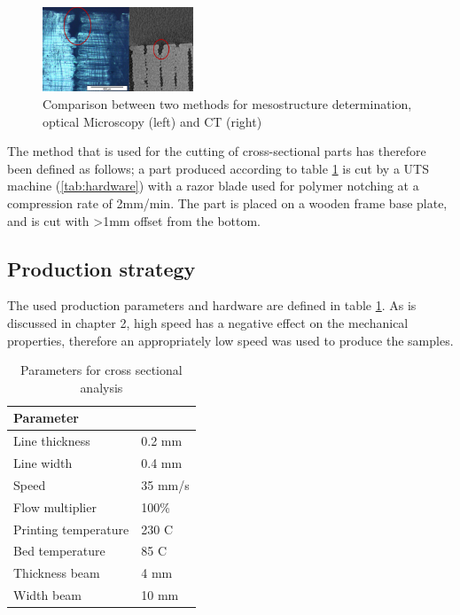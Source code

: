 \begin{figure}[H]
    \centering
    \includegraphics[width=0.4\textwidth]{chapter_4_RVE_Definition/figures/CTOM.jpg}
    \caption{Comparison between two methods for mesostructure determination, optical Microscopy (left) and CT (right) \cite{Veen2019EnhancingTemperature}}
    \label{fig:CTOM}
\end{figure}

The method that is used for the cutting of cross-sectional parts has therefore been defined as follows; a part produced according to table \ref{tab:parameters} is cut by a UTS machine (\ref{tab:hardware}) with a razor blade used for polymer notching at a compression rate of 2mm/min. The part is placed on a wooden frame base plate, and is cut with >1mm offset from the bottom.

\subsection{Production strategy}
The used production parameters and hardware are defined in table \ref{tab:parameters}. As is discussed in chapter 2,  high speed has a negative effect on the mechanical properties, therefore an appropriately low speed was used to produce the samples.

\begin{table}[h]
	\allign
	\caption{Parameters for cross sectional analysis}
	\label{tab:parameters}
	\begin{tabular}{ll}
		Parameter  &     \\
		\hline
		Line thickness & 0.2 mm \\
		Line width & 0.4 mm \\
		Speed & 35 mm/s \\
		Flow multiplier & 100\% \\
		Printing temperature & 230 C\textdegree \\
		Bed temperature & 85 C\textdegree \\
		Thickness beam & 4 mm \\
		Width beam & 10 mm \\

		\hline
	\end{tabular}
\end{table}

